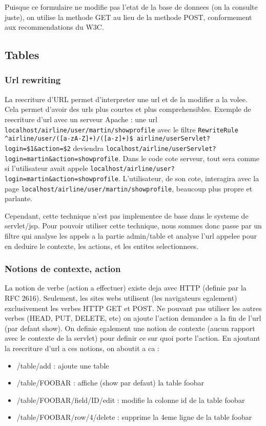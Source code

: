 Puisque ce formulaire ne modifie pas l'etat de la base de donnees (on la consulte juste), on utilise la methode GET au lieu de la methode POST, conformement aux recommendations du W3C.

\subsection{Tables}

\subsubsection{Url rewriting}
La reecriture d'URL permet d'interpreter une url et de la modifier a la volee. Cela permet d'avoir des urls plus courtes et plus comprehensibles. Exemple de reecriture d'url avec un serveur Apache :
une url \verb|localhost/airline/user/martin/showprofile| avec le filtre \verb|RewriteRule ^airline/user/([a-zA-Z]+)/([a-z]+)$ airline/userServlet?login=$1&action=$2| deviendra \verb|localhost/airline/userServlet?login=martin&action=showprofile|. Dans le code cote serveur, tout sera comme si l'utilisateur avait appele \verb|localhost/airline/user?login=martin&action=showprofile|. L'utilisateur, de son cote, interagira avec la page \verb|localhost/airline/user/martin/showprofile|, beaucoup plus propre et parlante.

Cependant, cette technique n'est pas implementee de base dans le systeme de servlet/jsp. Pour pouvoir utiliser cette technique, nous sommes donc passe par un filtre qui analyse les appels a la partie admin/table et analyse l'url appelee pour en deduire le contexte, les actions, et les entites selectionnees.

\subsubsection{Notions de contexte, action}
La notion de verbe (action a effectuer) existe deja avec HTTP (definie par la RFC 2616). Seulement, les sites webs utilisent (les navigateurs egalement) exclusivement les verbes HTTP GET et POST. Ne pouvant pas utiliser les autres verbes (HEAD, PUT, DELETE, etc) on ajoute l'action demandee a la fin de l'url (par defaut show). On definie egalement une notion de contexte (aucun rapport avec le contexte de la servlet) pour definir ce sur quoi porte l'action. En ajoutant la reecriture d'url a ces notions, on aboutit a ca :
\begin{itemize}
	\item{/table/add} : ajoute une table
	\item{/table/FOOBAR} : affiche (show par defaut) la table foobar
	\item{/table/FOOBAR/field/ID/edit} : modifie la colonne id de la table foobar
	\item{/table/FOOBAR/row/4/delete} :  supprime la 4eme ligne de la table foobar
\end{itemize}

